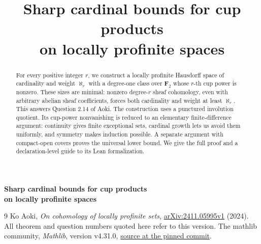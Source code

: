 \documentclass[11pt]{article}
\title{\bfseries Sharp cardinal bounds for cup products\\on locally profinite spaces}
\author{}
\date{}
\theoremstyle{plain}
\theoremstyle{definition}
\theoremstyle{remark}
\begin{document}
\thispagestyle{plain}
\begin{center}
{\Large\bfseries Sharp cardinal bounds for cup products\\[3pt]
on locally profinite spaces\par}
\end{center}
\vspace{0.5em}
\begin{abstract}
For every positive integer \(r\), we construct a locally profinite Hausdorff
space of cardinality and weight \(\aleph_r\) with a degree-one class over
\(\mathbf F_2\) whose \(r\)-th cup power is nonzero. These sizes are minimal:
nonzero degree-\(r\) sheaf cohomology, even with arbitrary abelian sheaf
coefficients, forces both cardinality and weight at least \(\aleph_r\).
This answers Question 2.14 of Aoki. The construction uses a punctured
involution quotient. Its cup-power nonvanishing is reduced to an elementary
finite-difference argument: continuity gives finite exceptional sets,
cardinal growth lets us avoid them uniformly, and symmetry makes induction
possible. A separate argument with compact-open covers proves the universal
lower bound. We give the full proof and a declaration-level guide to its
Lean formalization.
\end{abstract}







\appendix

\begin{thebibliography}{9}
Ko Aoki, \emph{On cohomology of locally profinite sets},
\href{https://arxiv.org/abs/2411.05995v1}{arXiv:2411.05995v1} (2024).
All theorem and question numbers quoted here refer to this version.
The mathlib community, \emph{Mathlib}, version v4.31.0,
\href{https://github.com/leanprover-community/mathlib4/tree/fabf563a7c95a166b8d7b6efca11c8b4dc9d911f}{source at the pinned commit}.
\end{thebibliography}
\end{document}
